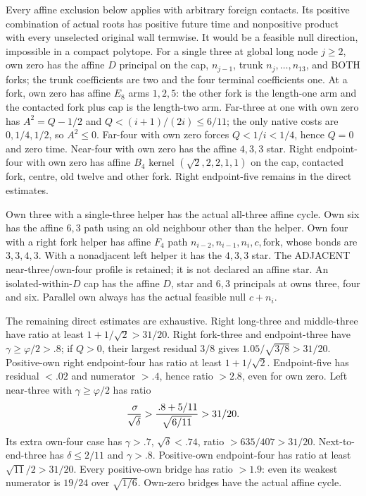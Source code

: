 \documentclass[11pt]{article}
\begin{document}
Every affine exclusion below applies with arbitrary foreign
contacts.  Its positive combination of actual roots has
positive future time and nonpositive product with every
unselected original wall termwise.
It would be a feasible null direction, impossible in a
compact polytope.
For a single three at global long node \(j\ge2\), own zero
has the affine \(D\) principal on the cap, \(n_{j-1}\),
trunk \(n_j,\ldots,n_{13}\), and BOTH forks;
the trunk coefficients are two and the four terminal
coefficients one.
At a fork, own zero has affine \(E_8\) arms \(1,2,5\):
the other fork is the length-one arm and the contacted fork
plus cap is the length-two arm.
Far-three at one with own zero has
\(A^2=Q-1/2\) and \(Q<(i+1)/(2i)\le6/11\);
the only native costs are \(0,1/4,1/2\), so \(A^2\le0\).
Far-four with own zero forces \(Q<1/i<1/4\),
hence \(Q=0\) and zero time.
Near-four with own zero has the affine \(4,3,3\) star.
Right endpoint-four with own zero has affine \(B_4\)
kernel \((\sqrt2,2,2,1,1)\) on the cap, contacted fork,
centre, old twelve and other fork.
Right endpoint-five remains in the direct estimates.

Own three with a single-three helper has the actual
all-three affine cycle.
Own six has the affine \(6,3\) path using an old neighbour
other than the helper.
Own four with a right fork helper has affine \(F_4\)
path \(n_{i-2},n_{i-1},n_i,c,\text{fork}\),
whose bonds are \(3,3,4,3\).
With a nonadjacent left helper it has the \(4,3,3\) star.
The ADJACENT near-three/own-four profile is retained;
it is not declared an affine star.
An isolated-within-\(D\) cap has the affine \(D\),
star and \(6,3\) principals at owns three, four and six.
Parallel own always has the actual feasible null \(c+n_i\).

The remaining direct estimates are exhaustive.
Right long-three and middle-three have ratio at least
\(1+1/\sqrt2>31/20\).
Right fork-three and endpoint-three have
\(\gamma\ge\varphi/2>.8\); if \(Q>0\), their largest
residual \(3/8\) gives
\(1.05/\sqrt{3/8}>31/20\).
Positive-own right endpoint-four has ratio at least
\(1+1/\sqrt2\).
Endpoint-five has residual \(<.02\) and numerator \(>.4\),
hence ratio \(>2.8\), even for own zero.
Left near-three with \(\gamma\ge\varphi/2\) has ratio
\[
 {\,\sigma\over\sqrt\delta}>
 {\, .8+5/11\over\sqrt{6/11}}>31/20 .
\]
Its extra own-four case has \(\gamma>.7\),
\(\sqrt\delta<.74\), ratio \(>635/407>31/20\).
Next-to-end-three has \(\delta\le2/11\) and \(\gamma>.8\).
Positive-own endpoint-four has ratio at least
\(\sqrt{11}/2>31/20\).
Every positive-own bridge has ratio \(>1.9\):
even its weakest numerator is \(19/24\) over \(\sqrt{1/6}\).
Own-zero bridges have the actual affine cycle.
\end{document}
